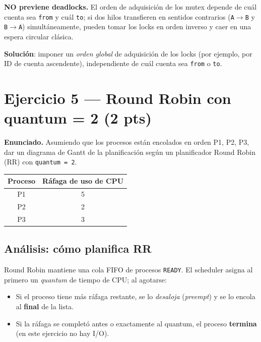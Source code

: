\documentclass[11pt,a4paper]{article}
\begin{document}
\begin{respuesta}
\textbf{NO previene deadlocks.} El orden de adquisición de los
mutex depende de cuál cuenta sea \texttt{from} y cuál \texttt{to};
si dos hilos transfieren en sentidos contrarios
(\texttt{A}$\to$\texttt{B} y \texttt{B}$\to$\texttt{A})
simultáneamente, pueden tomar los locks en orden inverso y caer en
una espera circular clásica.

\textbf{Solución}: imponer un \emph{orden global} de adquisición de
los locks (por ejemplo, por ID de cuenta ascendente), independiente
de cuál cuenta sea \texttt{from} o \texttt{to}.
\end{respuesta}

\section{Ejercicio 5 --- Round Robin con quantum = 2 (2 pts)}

\textbf{Enunciado.} Asumiendo que los procesos están encolados en
orden P1, P2, P3, dar un diagrama de Gantt de la planificación según
un planificador Round Robin (RR) con \texttt{quantum = 2}.

\begin{center}
\small
\begin{tabular}{@{}cc@{}}
\toprule
Proceso & Ráfaga de uso de CPU \\
\midrule
P1 & 5 \\
P2 & 2 \\
P3 & 3 \\
\bottomrule
\end{tabular}
\end{center}

\subsection*{Análisis: cómo planifica RR}

Round Robin mantiene una cola FIFO de procesos \texttt{READY}. El
scheduler asigna al primero un \emph{quantum} de tiempo de CPU; al
agotarse:

\begin{itemize}[leftmargin=*,nosep]
    \item Si el proceso tiene más ráfaga restante, se lo
        \emph{desaloja} (\emph{preempt}) y se lo encola al
        \textbf{final} de la lista.
    \item Si la ráfaga se completó antes o exactamente al quantum,
        el proceso \textbf{termina} (en este ejercicio no hay I/O).
\end{itemize}
\end{document}

